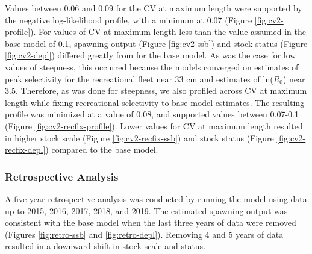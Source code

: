 \documentclass[11pt,
  english,
  a4paper,
]{article}
\begin{document}
\leavevmode\tagmcend\tagstructend\par


Values between 0.06 and 0.09 for the CV at maximum length were supported by the negative log-likelihood profile, with a minimum at 0.07 (Figure \ref{fig:cv2-profile}). For values of CV at maximum length less than the value assumed in the base model of 0.1, spawning output (Figure \ref{fig:cv2-ssb}) and stock status (Figure \ref{fig:cv2-depl}) differed greatly from for the base model. As was the case for low values of steepness, this occurred because the models converged on estimates of peak selectivity for the recreational fleet near 33 cm and estimates of ln({\(R_0\)\leavevmode\tagmcend\tagstructend}) near 3.5. Therefore, as was done for steepness, we also profiled across CV at maximum length while fixing recreational selectivity to base model estimates. The resulting profile was minimized at a value of 0.08, and supported values between 0.07-0.1 (Figure \ref{fig:cv2-recfix-profile}). Lower values for CV at maximum length resulted in higher stock scale (Figure \ref{fig:cv2-recfix-ssb}) and stock status (Figure \ref{fig:cv2-recfix-depl}) compared to the base model.

\leavevmode\tagmcend\tagstructend\par


\hypertarget{retrospective-analysis}{%
\subsubsection{Retrospective Analysis}\label{retrospective-analysis}}

\leavevmode\tagmcend\tagstructend


A five-year retrospective analysis was conducted by running the model using data up to 2015, 2016, 2017, 2018, and 2019. The estimated spawning output was consistent with the base model when the last three years of data were removed (Figures \ref{fig:retro-ssb} and \ref{fig:retro-depl}). Removing 4 and 5 years of data resulted in a downward shift in stock scale and status.

\leavevmode\tagmcend\tagstructend\par

\end{document}
